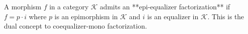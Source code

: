 A morphism $f$ in a category $\mathcal{K}$ admits an **epi-equalizer factorization** if $f = p \cdot i$ where $p$ is an epimorphism in $\mathcal{K}$ and $i$ is an equalizer in $\mathcal{K}$. This is the dual concept to coequalizer-mono factorization.
